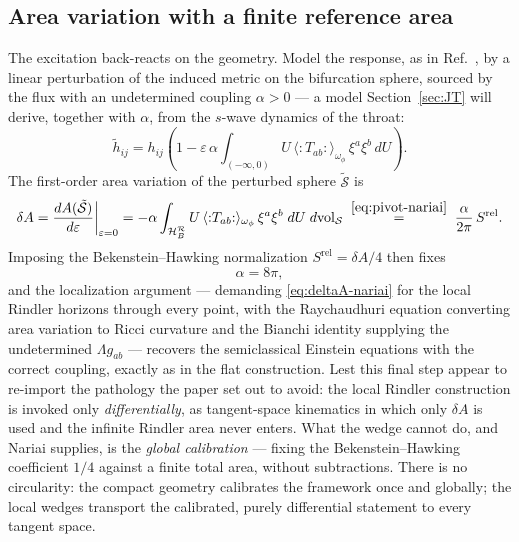 \documentclass[11pt]{article}
\newcommand{\Srel}{S^{\mathrm{rel}}}
\newcommand{\Nariai}{Nariai}
\begin{document}
\subsection{Area variation with a finite reference area}

The excitation back-reacts on the geometry. Model the response, as in Ref.~\cite{DorauMuch}, by a linear perturbation of the induced metric on the bifurcation sphere, sourced by the flux with an undetermined coupling $\alpha > 0$ --- a model Section~\ref{sec:JT} will derive, together with $\alpha$, from the $s$-wave dynamics of the throat:
\begin{equation}
\tilde{h}_{ij}
= h_{ij}\left(1 - \varepsilon\,\alpha \int_{(-\infty,0)} U\, \langle{:}T_{ab}{:}\rangle_{\omega_\phi}\, \xi^a\xi^b \, dU \right).
\label{eq:perturbation}
\end{equation}
The first-order area variation of the perturbed sphere $\tilde{\mathcal{S}}$ is
\begin{equation}
\delta A
= \frac{dA(\tilde{\mathcal{S}})}{d\varepsilon}\bigg|_{\varepsilon = 0}
= -\alpha \int_{\mathcal{H}_B^{\mathcal{R}}} U\, \langle{:}T_{ab}{:}\rangle_{\omega_\phi}\, \xi^a\xi^b \; dU\; d\mathrm{vol}_{\mathcal{S}}
\;\overset{\eqref{eq:pivot-nariai}}{=}\;
\frac{\alpha}{2\pi}\, \Srel .
\label{eq:deltaA-nariai}
\end{equation}
Imposing the Bekenstein--Hawking normalization $\Srel = \delta A / 4$ then fixes
\begin{equation}
\alpha = 8\pi,
\end{equation}
and the localization argument --- demanding \eqref{eq:deltaA-nariai} for the local Rindler horizons through every point, with the Raychaudhuri equation converting area variation to Ricci curvature and the Bianchi identity supplying the undetermined $\Lambda g_{ab}$ --- recovers the semiclassical Einstein equations with the correct coupling, exactly as in the flat construction. Lest this final step appear to re-import the pathology the paper set out to avoid: the local Rindler construction is invoked only \emph{differentially}, as tangent-space kinematics in which only $\delta A$ is used and the infinite Rindler area never enters. What the wedge cannot do, and \Nariai{} supplies, is the \emph{global calibration} --- fixing the Bekenstein--Hawking coefficient $1/4$ against a finite total area, without subtractions. There is no circularity: the compact geometry calibrates the framework once and globally; the local wedges transport the calibrated, purely differential statement to every tangent space.
\end{document}
